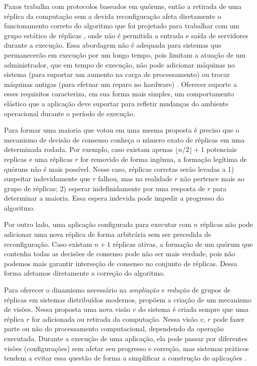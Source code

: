 Paxos trabalha com protocolos baseados em quóruns, então a retirada de uma réplica da
computação sem a devida reconfiguração afeta diretamente o funcionamento correto do
algoritmo que foi projetado para trabalhar com um grupo estático de réplicas
\cite{chandra96, lamport98}, onde não é permitida a entrada e saída de servidores durante
a execução. Essa abordagem não é adequada para sistemas que permanecerão em execução por
um longo tempo, pois limitam a atuação de um administrador, que em tempo de execução, não
pode adicionar máquinas no sistema (para suportar um aumento na carga de processamento) ou
trocar máquinas antigas (para efetuar um reparo no hardware) \cite{alchieri14}. Oferecer
suporte a esses requisitos caracteriza, em sua forma mais simples, um comportamento
elástico que a aplicação deve suportar para refletir mudanças do ambiente operacional
durante o período de execução.

Para formar uma maioria que votou em uma mesma proposta é preciso que o mecanismo de
decisão de consenso conheça o número exato de réplicas em uma determinada rodada. Por
exemplo, caso existam apenas $\lfloor n/2 \rfloor + 1$ potenciais replicas e uma réplicas
$r$ for removido de forma ingênua, a formação legítima de quóruns não é mais possível.
Nesse caso, réplicas corretas serão levadas a 1) suspeitar indevidamente que $r$ falhou,
mas na realidade $r$ não pertence mais ao grupo de réplicas; 2) esperar indefinidamente
por uma resposta de $r$ para determinar a maioria. Essa espera indevida pode impedir a
progresso do algoritmo.

Por outro lado, uma aplicação configurada para executar com $n$ réplicas não pode
adicionar uma nova réplica de forma arbitrária sem ser precedida de reconfiguração. Caso
existam $n + 1$ réplicas ativas, a formação de um quórum que contenha todas as decisões de
consenso pode não ser mais verdade, pois não podemos mais garantir interseção de consenso
no conjunto de réplicas. Dessa forma afetamos diretamente a correção do algoritmo.

Para oferecer o dinamismo necessário na \emph{ampliação} e \emph{redução} de grupos
de réplicas em sistemas distribuídos modernos,  propõem a criação de
um mecanismo de visões. Nessa proposta uma nova visão $v$ do sistema é criada sempre que uma
réplica $r$ for adicionada ou retirada da computação. Nessa visão $v$, $r$ pode fazer
parte ou não do processamento computacional, dependendo da operação executada. Durante a
execução de uma aplicação, ela pode passar por diferentes visões (configurações) sem
afetar seu progresso e correção, mas sistemas práticos tendem a evitar essa questão de
forma a simplificar a construção de aplicações \cite{chandra07}.

